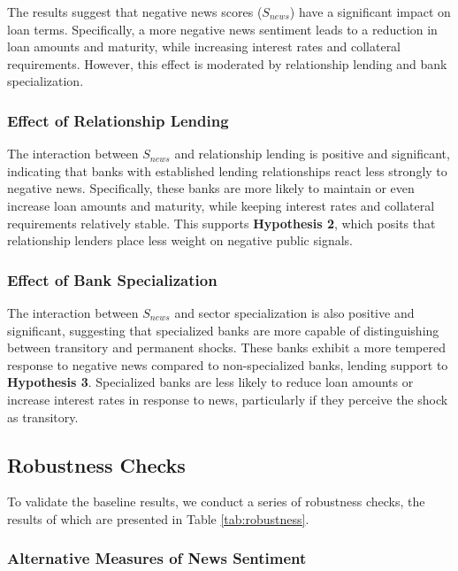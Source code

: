 The results suggest that negative news scores ($S_{news}$) have a significant impact on loan terms. Specifically, a more negative news sentiment leads to a reduction in loan amounts and maturity, while increasing interest rates and collateral requirements. However, this effect is moderated by relationship lending and bank specialization.

\subsubsection{Effect of Relationship Lending}

The interaction between $S_{news}$ and relationship lending is positive and significant, indicating that banks with established lending relationships react less strongly to negative news. Specifically, these banks are more likely to maintain or even increase loan amounts and maturity, while keeping interest rates and collateral requirements relatively stable. This supports \textbf{Hypothesis 2}, which posits that relationship lenders place less weight on negative public signals.

\subsubsection{Effect of Bank Specialization}

The interaction between $S_{news}$ and sector specialization is also positive and significant, suggesting that specialized banks are more capable of distinguishing between transitory and permanent shocks. These banks exhibit a more tempered response to negative news compared to non-specialized banks, lending support to \textbf{Hypothesis 3}. Specialized banks are less likely to reduce loan amounts or increase interest rates in response to news, particularly if they perceive the shock as transitory.

\subsection{Robustness Checks}

To validate the baseline results, we conduct a series of robustness checks, the results of which are presented in Table \ref{tab:robustness}. 

\subsubsection{Alternative Measures of News Sentiment}

